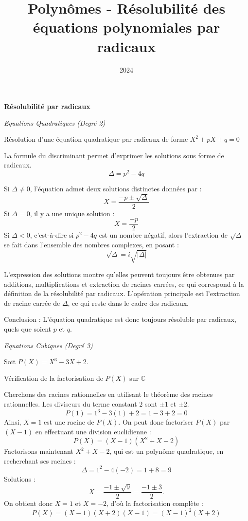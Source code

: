 \documentclass[10pt,a4paper]{article}
\title{Polynômes - Résolubilité des équations polynomiales par radicaux}
\author{}
\date{2024}
\begin{document}
\bigskip
\textbf{Résolubilité par radicaux}

\bigskip
\textit{Equations Quadratiques (Degré 2)}

\q Résolution d'une équation quadratique par radicaux de forme \( X^2 + pX + q = 0 \)

La formule du discriminant permet d'exprimer les solutions sous forme de radicaux.
\[
\Delta = p^2 - 4q
\]

Si \( \Delta \neq 0 \), l'équation admet deux solutions distinctes données par :
\[
X = \frac{-p \pm \sqrt{\Delta}}{2}
\]
Si \( \Delta = 0 \), il y a une unique solution :
\[
X = \frac{-p}{2}
\]
Si \( \Delta < 0 \), c'est-à-dire si \( p^2 - 4q \) est un nombre négatif, alors l'extraction de \(
\sqrt{\Delta} \) se fait dans l'ensemble des nombres complexes, en posant :
\[
\sqrt{\Delta} = i \sqrt{|\Delta|}
\]

L'expression des solutions montre qu'elles peuvent toujours être obtenues par additions,
multiplications et extraction de racines carrées, ce qui correspond à la définition de la
résolubilité par radicaux.
L'opération principale est l'extraction de racine carrée de \( \Delta \), ce qui reste dans le
cadre des radicaux.

Conclusion : L'équation quadratique est donc toujours résoluble par radicaux, quels que soient \( p
\) et \( q \).

\bigskip
\textit{Equations Cubiques (Degré 3)}

\q Soit \( P(X) = X^3 - 3X + 2 \).

Vérification de la factorisation de \( P(X) \) sur \( \mathbb{C} \)

Cherchons des racines rationnelles en utilisant le théorème des racines rationnelles. Les diviseurs
du terme constant \( 2 \) sont \( \pm 1 \) et \( \pm 2 \).
\[
P(1) = 1^3 - 3(1) + 2 = 1 - 3 + 2 = 0
\]
Ainsi, \( X = 1 \) est une racine de \( P(X) \). On peut donc factoriser \( P(X) \) par \( (X - 1)
\) en effectuant une division euclidienne :
\[
P(X) = (X - 1)(X^2 + X - 2)
\]
Factorisons maintenant \( X^2 + X - 2 \), qui est un polynôme quadratique, en recherchant ses
racines :
\[
\Delta = 1^2 - 4(-2) = 1 + 8 = 9
\]
Solutions :
\[
X = \frac{-1 \pm \sqrt{9}}{2} = \frac{-1 \pm 3}{2}.
\]
On obtient donc \( X = 1 \) et \( X = -2 \), d'où la factorisation complète :
\[
P(X) = (X - 1)(X + 2)(X - 1) = (X - 1)^2 (X + 2)
\]
\end{document}
